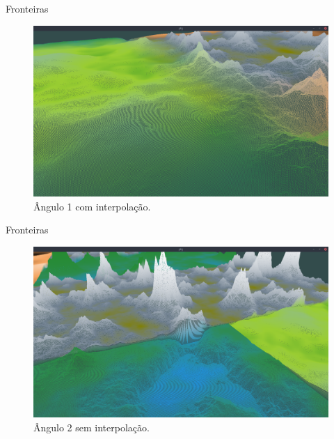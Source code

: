 \begin{frame}{Fronteiras}
    \begin{figure}[H]
        \centering
        \includegraphics[width=.9\textwidth]{img/border/a9/1c.png}
        \caption{Ângulo 1 com interpolação.}
        \label{fig:img_border_a9_1c}
    \end{figure}
    
\end{frame}

\begin{frame}{Fronteiras}
    \begin{figure}[H]
        \centering
        \includegraphics[width=.9\textwidth]{img/border/a9/2s.png}
        \caption{Ângulo 2 sem interpolação.}
        \label{fig:img_border_a9_2s}
    \end{figure}
    
\end{frame}


